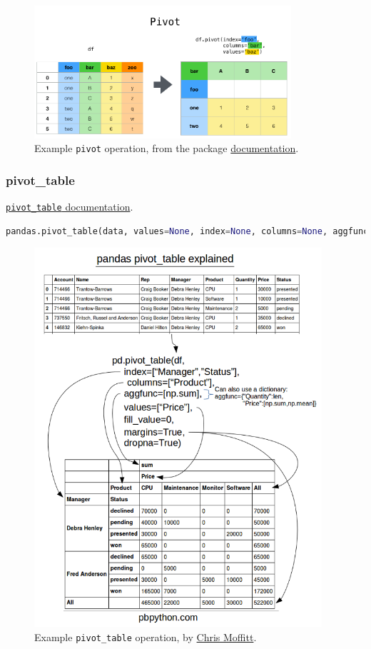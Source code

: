 \begin{figure}[H]
\centering
\includegraphics[width=0.85\textwidth]{figures/pandas/reshaping_pivot.png}
\caption{
Example \pandas \texttt{pivot} operation, from the package \href{http://pandas.pydata.org/pandas-docs/stable/user_guide/reshaping.html}{documentation}.
}
\label{fig:pandas:pivot}
\end{figure}

\subsubsection{pivot\_table}
\label{pandas:pivoting:pivot_table}

\noindent \href{https://pandas.pydata.org/pandas-docs/stable/reference/api/pandas.pivot_table.html}{\texttt{pivot\_table} documentation}.

\begin{lstlisting}[language=Python]
pandas.pivot_table(data, values=None, index=None, columns=None, aggfunc='mean', fill_value=None, margins=False, dropna=True, margins_name='All')
\end{lstlisting}

\begin{figure}[H]
\centering
\includegraphics[width=0.95\textwidth]{figures/pandas/pivot-table-datasheet.png}
\caption{
Example \pandas \texttt{pivot\_table} operation, by \href{http://pbpython.com/pandas-pivot-table-explained.html}{Chris Moffitt}.
}
\label{fig:pandas:pivot_table}
\end{figure}
